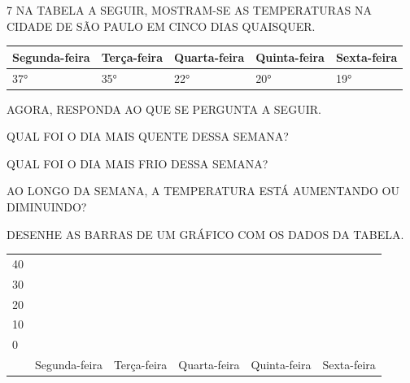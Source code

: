 
\num{7} NA TABELA A SEGUIR, MOSTRAM-SE AS TEMPERATURAS NA CIDADE DE SÃO PAULO EM CINCO
DIAS QUAISQUER.


\begin{longtable}[]{@{}lllll@{}}
\toprule
Segunda-feira & Terça-feira & Quarta-feira & Quinta-feira & Sexta-feira\tabularnewline
\midrule
\endhead
37° & 35° & 22° & 20° & 19°\tabularnewline
\bottomrule
\end{longtable}

AGORA, RESPONDA AO QUE SE PERGUNTA A SEGUIR.

\begin{escolha}
\item QUAL FOI O DIA MAIS QUENTE DESSA SEMANA?


\item QUAL FOI O DIA MAIS FRIO DESSA SEMANA?


\item AO LONGO DA SEMANA, A TEMPERATURA ESTÁ AUMENTANDO OU DIMINUINDO?


\item DESENHE AS BARRAS DE UM GRÁFICO COM OS DADOS DA TABELA.

\begin{longtable}[]{@{}llllll@{}}
\toprule
40 & & & & &\tabularnewline
30 & & & & &\tabularnewline
20 & & & & &\tabularnewline
10 & & & & &\tabularnewline
0 & & & & &\tabularnewline
& Segunda-feira & Terça-feira & Quarta-feira & Quinta-feira & Sexta-feira\tabularnewline
\bottomrule
\end{longtable}

\end{escolha}


